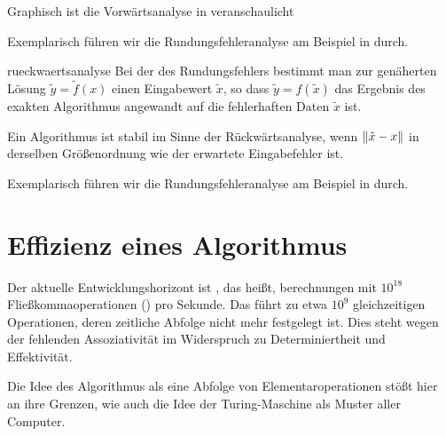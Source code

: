 \begin{remark}
  Graphisch ist die Vorwärtsanalyse in \cite[Abschnitt
  2.3.1]{DeuflhardHohmann08} veranschaulicht
\end{remark}

\begin{example}
  Exemplarisch führen wir die Rundungsfehleranalyse am Beispiel in
  \cite[Abschnitt 1.3.2]{Rannacher17} durch.
\end{example}

\begin{Definition}{rueckwaertsanalyse}
  Bei der  des Rundungsfehlers bestimmt man
  zur genäherten Lösung $\tilde y = \tilde f(x)$ einen Eingabewert
  $\tilde x$, so dass $\tilde y = f(\tilde x)$ das Ergebnis des
  exakten Algorithmus angewandt auf die fehlerhaften Daten $\tilde x$
  ist.

  Ein Algorithmus ist stabil im Sinne der Rückwärtsanalyse, wenn
  $\lVert\tilde x-x\rVert$ in derselben Größenordnung wie der erwartete
  Eingabefehler ist.
\end{Definition}

\begin{example}
  Exemplarisch führen wir die Rundungsfehleranalyse am Beispiel in
  \cite[Lemma 2.30]{DeuflhardHohmann08} durch.
\end{example}

\section{Effizienz eines Algorithmus}

\begin{remark}
  Der aktuelle Entwicklungshorizont ist ,
  das heißt, berechnungen mit $10^{18}$ Fließkommaoperationen
  () pro Sekunde. Das führt zu etwa $10^9$ gleichzeitigen
  Operationen, deren zeitliche Abfolge nicht mehr festgelegt ist. Dies
  steht wegen der fehlenden Assoziativität im Widerspruch zu
  Determiniertheit und Effektivität.

  Die Idee des Algorithmus als eine \glqq Abfolge von
  Elementaroperationen\grqq{} stößt hier an ihre Grenzen, wie auch die
  Idee der Turing-Maschine als Muster aller Computer.
\end{remark}

